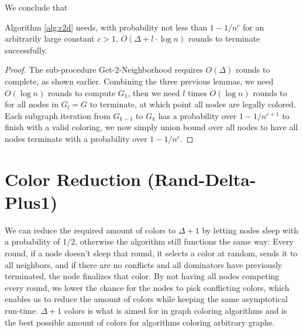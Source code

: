 We conclude that

\begin{theorem}
\label{theorem:r2dkomplett}
	Algorithm \ref{alg:r2d} needs, with probability not less than $1-1/n^c$ for an arbitrarily large constant $c>1$, $O(\Delta + l \cdot \log n)$ rounds to terminate successfully.
\end{theorem}
\begin{proof}
	The sub-procedure Get-$2$-Neighborhood requires $O(\Delta)$ rounds to complete, as shown earlier. Combining the three previous lemmas, we need $O(\log n)$ rounds to compute $G_1$, then we need $l$ times $O(\log n)$ rounds to for all nodes in $G_l = G$ to terminate, at which point all nodes are legally colored. Each subgraph iteration from $G_{k-1}$ to $G_k$ has a probability over $1-1/n^{c+1}$ to finish with a valid coloring, we now simply union bound over all nodes to have all nodes terminate with a probability over $1-1/n^c$.
\end{proof}

\section{Color Reduction (Rand-Delta-Plus1)}

We can reduce the required amount of colors to $\Delta+1$ by letting nodes sleep with a probability of $1/2$, otherwise the algorithm still functions the same way: Every round, if a node doesn't sleep that round, it selects a color at random, sends it to all neighbors, and if there are no conflicts and all dominators have previously terminated, the node finalizes that color. By not having all nodes competing every round, we lower the chance for the nodes to pick conflicting colors, which enables us to reduce the amount of colors while keeping the same asymptotical run-time. $\Delta+1$ colors is what is aimed for in graph coloring algorithms and is the best possible amount of colors for algorithms coloring arbitrary graphs.


